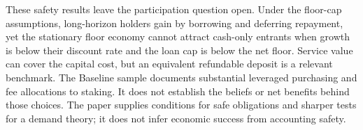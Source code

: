 These safety results leave the participation question open. Under the floor-cap assumptions, long-horizon holders gain by borrowing and deferring repayment, yet the stationary floor economy cannot attract cash-only entrants when growth is below their discount rate and the loan cap is below the net floor. Service value can cover the capital cost, but an equivalent refundable deposit is a relevant benchmark. The Baseline sample documents substantial leveraged purchasing and fee allocations to staking. It does not establish the beliefs or net benefits behind those choices. The paper supplies conditions for safe obligations and sharper tests for a demand theory; it does not infer economic success from accounting safety.
